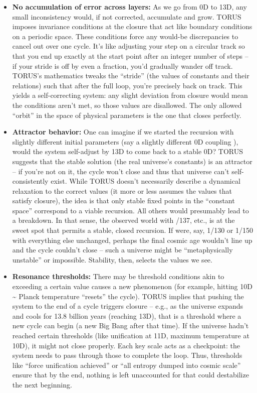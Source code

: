 \documentclass[]{article}
\begin{document}
{\begin{itemize}
\item
  \textbf{No accumulation of error across layers:} As we go from 0D to
  13D, any small inconsistency would, if not corrected, accumulate and
  grow. TORUS imposes invariance conditions at the closure that act like
  boundary conditions on a periodic space​. These conditions force any
  would-be discrepancies to cancel out over one cycle. It's like
  adjusting your step on a circular track so that you end up exactly at
  the start point after an integer number of steps -- if your stride is
  off by even a fraction, you'd gradually wander off track. TORUS's
  mathematics tweaks the ``stride'' (the values of constants and their
  relations) such that after the full loop, you're precisely back on
  track. This yields a self-correcting system: any slight deviation from
  closure would mean the conditions aren't met, so those values are
  disallowed. The only allowed ``orbit'' in the space of physical
  parameters is the one that closes perfectly.
\item
  \textbf{Attractor behavior:} One can imagine if we started the
  recursion with slightly different initial parameters (say a slightly
  different 0D coupling \alpha), would the system self-adjust by 13D to come
  back to a stable 0D? TORUS suggests that the stable solution (the real
  universe's constants) is an attractor -- if you're not on it, the
  cycle won't close and thus that universe can't self-consistently
  exist. While TORUS doesn't necessarily describe a dynamical relaxation
  to the correct values (it more or less assumes the values that satisfy
  closure), the idea is that only stable fixed points in the ``constant
  space'' correspond to a viable recursion. All others would presumably
  lead to a breakdown. In that sense, the observed world with \alpha {}/137,
  etc., is at the sweet spot that permits a stable, closed recursion. If
  \alpha were, say, 1/130 or 1/150 with everything else unchanged, perhaps
  the final cosmic age wouldn't line up and the cycle couldn't close --
  such a universe might be ``metaphysically unstable'' or impossible.
  Stability, then, selects the values we see.
\item
  \textbf{Resonance thresholds:} There may be threshold conditions akin
  to exceeding a certain value causes a new phenomenon (for example,
  hitting 10D \textasciitilde{} Planck temperature ``resets'' the
  cycle). TORUS implies that pushing the system to the end of a cycle
  triggers closure -- e.g., as the universe expands and cools for 13.8
  billion years (reaching 13D), that is a threshold where a new cycle
  can begin (a new Big Bang after that time). If the universe hadn't
  reached certain thresholds (like unification at 11D, maximum
  temperature at 10D), it might not close properly. Each key scale acts
  as a checkpoint: the system needs to pass through those to complete
  the loop. Thus, thresholds like ``force unification achieved'' or
  ``all entropy dumped into cosmic scale'' ensure that by the end,
  nothing is left unaccounted for that could destabilize the next
  beginning.
\end{itemize}

}
\end{document}
